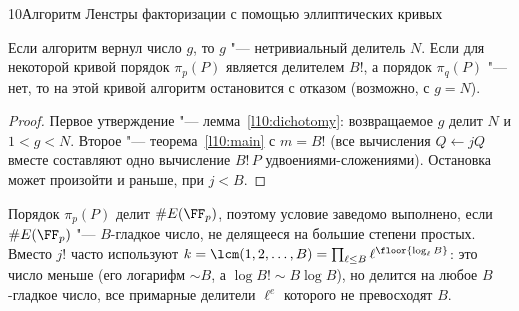 \begin{lecture}{10}{Алгоритм Ленстры факторизации с помощью эллиптических кривых}
\begin{theorem}[корректность]\label{l10:correct}
Если алгоритм вернул число $g$, то $g$ "--- нетривиальный делитель $N$. Если для некоторой
кривой порядок $\pi_p(P)$ является делителем $B!$, а порядок $\pi_q(P)$ "--- нет, то на этой
кривой алгоритм остановится с отказом (возможно, с $g = N$).
\end{theorem}

\begin{proof}
Первое утверждение "--- лемма~\ref{l10:dichotomy}: возвращаемое $g$ делит $N$ и $1 < g < N$.
Второе "--- теорема~\ref{l10:main} с $m = B!$ (все вычисления $Q \gets jQ$ вместе составляют
одно вычисление $B!\,P$ удвоениями-сложениями). Остановка может произойти и раньше, при
$j < B$.
\end{proof}

Порядок $\pi_p(P)$ делит $\#E(\FF_p)$, поэтому условие заведомо выполнено, если $\#E(\FF_p)$
"--- $B$-гладкое число, не делящееся на большие степени простых. Вместо $j!$ часто используют
$k = \lcm(1, 2, \dots, B) = \prod_{\ell \le B} \ell^{\floor{\log_\ell B}}$: это число меньше
(его логарифм $\sim B$, а $\log B! \sim B \log B$), но делится на любое $B$-гладкое число,
все примарные делители $\ell^e$ которого не превосходят $B$.



\end{lecture}
